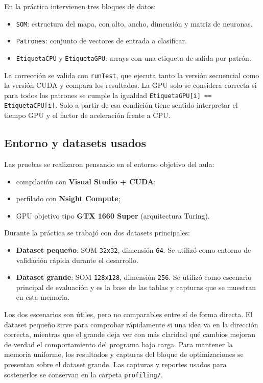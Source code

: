 \documentclass[11pt,a4paper]{article}
\begin{document}
En la práctica intervienen tres bloques de datos:
\begin{itemize}
  \item \texttt{SOM}: estructura del mapa, con alto, ancho, dimensión y matriz de neuronas.
  \item \texttt{Patrones}: conjunto de vectores de entrada a clasificar.
  \item \texttt{EtiquetaCPU} y \texttt{EtiquetaGPU}: arrays con una etiqueta de salida por patrón.
\end{itemize}

La corrección se valida con \texttt{runTest}, que ejecuta tanto la versión secuencial como la versión CUDA y compara los resultados. La GPU solo se considera correcta si para todos los patrones se cumple la igualdad \texttt{EtiquetaGPU[i] == EtiquetaCPU[i]}. Solo a partir de esa condición tiene sentido interpretar el tiempo GPU y el factor de aceleración frente a CPU.

\subsection{Entorno y datasets usados}

Las pruebas se realizaron pensando en el entorno objetivo del aula:
\begin{itemize}
  \item compilación con \textbf{Visual Studio + CUDA};
  \item perfilado con \textbf{Nsight Compute};
  \item GPU objetivo tipo \textbf{GTX 1660 Super} (arquitectura Turing).
\end{itemize}

Durante la práctica se trabajó con dos datasets principales:
\begin{itemize}
  \item \textbf{Dataset pequeño}: SOM \texttt{32x32}, dimensión \texttt{64}. Se utilizó como entorno de validación rápida durante el desarrollo.
  \item \textbf{Dataset grande}: SOM \texttt{128x128}, dimensión \texttt{256}. Se utilizó como escenario principal de evaluación y es la base de las tablas y capturas que se muestran en esta memoria.
\end{itemize}

Los dos escenarios son útiles, pero no comparables entre sí de forma directa. El dataset pequeño sirve para comprobar rápidamente si una idea va en la dirección correcta, mientras que el grande deja ver con más claridad qué cambios mejoran de verdad el comportamiento del programa bajo carga. Para mantener la memoria uniforme, los resultados y capturas del bloque de optimizaciones se presentan sobre el dataset grande. Las capturas y reportes usados para sostenerlos se conservan en la carpeta \texttt{profiling/}.
\end{document}
